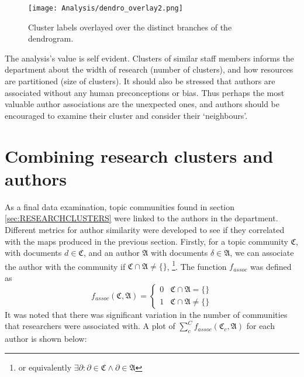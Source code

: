 \begin{center}
\begin{figure}[H]
\label{fig:LABELLEDDENDRO}
  \centering
    \texttt{[image: Analysis/dendro\_overlay2.png]}
    \caption{Cluster labels overlayed over the distinct branches of the dendrogram.}
\end{figure} 
\end{center}
The analysis's value is self evident. Clusters of similar staff members informs the department about the width of research (number of clusters), and how resources are partitioned (size of clusters). It should also be stressed that authors are associated without any human preconceptions or bias. Thus perhaps the most valuable author associations are the unexpected ones, and authors should be encouraged to examine their cluster and consider their `neighbours'.
\section{Combining research clusters and authors}
As a final data examination, topic communities found in section \ref{sec:RESEARCHCLUSTERS} were linked to the authors in the department. Different metrics for author similarity were developed to see if they correlated with the maps produced in the previous section.
Firstly, for a topic community $\mathfrak{C}$, with documents $d \in \mathfrak{C}$, and an author $\mathfrak{A}$ with documents $\delta \in \mathfrak{A}$, we can associate the author with the community if $\mathfrak{C} \cap \mathfrak{A} \neq \{ \}$, \footnote{or equivalently $\exists  \partial : \partial \in \mathfrak{C} \wedge \partial \in \mathfrak{A} $}. The function $f_{assoc}$ was defined as 
\[ 
f_{assoc}\left( \mathfrak{C} , \mathfrak{A} \right) = \begin{cases} 
      0 & \mathfrak{C} \cap \mathfrak{A} = \{ \} \\
      1 & \mathfrak{C} \cap \mathfrak{A} \neq \{ \} 
   \end{cases}
\]
It was noted that there was significant variation in the number of communities that researchers were associated with. A plot of $\sum_c^C f_{assoc} \left( \mathfrak{C}_c , \mathfrak{A} \right)$ for each author is shown below:
